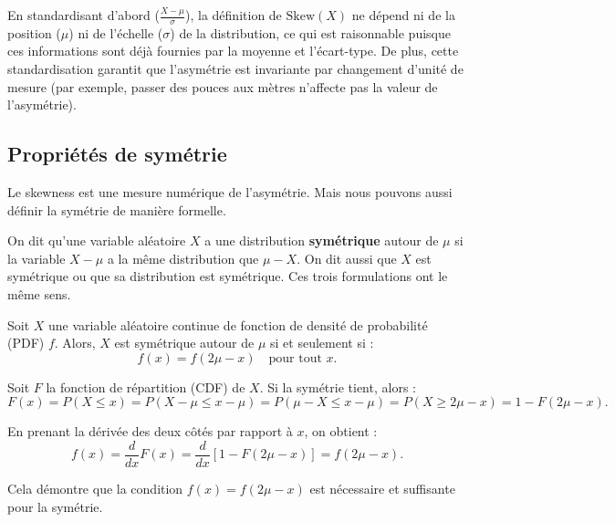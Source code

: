 \begin{remarquebox}
En standardisant d'abord ($\frac{X-\mu}{\sigma}$), la définition de $\text{Skew}(X)$ ne dépend ni de la position ($\mu$) ni de l'échelle ($\sigma$) de la distribution, ce qui est raisonnable puisque ces informations sont déjà fournies par la moyenne et l'écart-type. De plus, cette standardisation garantit que l'asymétrie est invariante par changement d'unité de mesure (par exemple, passer des pouces aux mètres n'affecte pas la valeur de l'asymétrie).
\end{remarquebox}

\subsection{Propriétés de symétrie}

Le skewness est une mesure numérique de l'asymétrie. Mais nous pouvons aussi définir la symétrie de manière formelle.

\begin{definitionbox}
On dit qu'une variable aléatoire $X$ a une distribution \textbf{symétrique} autour de $\mu$ si la variable $X - \mu$ a la même distribution que $\mu - X$. On dit aussi que $X$ est symétrique ou que sa distribution est symétrique. Ces trois formulations ont le même sens.
\end{definitionbox}

\begin{theorembox}
Soit $X$ une variable aléatoire continue de fonction de densité de probabilité (PDF) $f$. Alors, $X$ est symétrique autour de $\mu$ si et seulement si :
$$ f(x) = f(2\mu - x) \quad \text{pour tout } x. $$
\end{theorembox}

\begin{proofbox}
Soit $F$ la fonction de répartition (CDF) de $X$. Si la symétrie tient, alors :
$$ F(x) = P(X \le x) = P(X - \mu \le x - \mu) = P(\mu - X \le x - \mu) = P(X \ge 2\mu - x) = 1 - F(2\mu - x). $$

En prenant la dérivée des deux côtés par rapport à $x$, on obtient :
$$ f(x) = \frac{d}{dx}F(x) = \frac{d}{dx}[1 - F(2\mu - x)] = f(2\mu - x). $$

Cela démontre que la condition $f(x) = f(2\mu - x)$ est nécessaire et suffisante pour la symétrie.
\end{proofbox}

